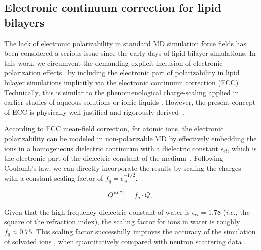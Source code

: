 \documentclass[aip,jcp,twocolumn]{revtex4}
\begin{document}
\subsection{Electronic continuum correction for lipid bilayers}\label{section:ecc}
The lack of electronic polarizability in standard MD simulation force fields has been considered a serious issue since the early days of lipid bilayer simulations. In this work, we circumvent the demanding explicit inclusion of electronic polarization effects~\cite{lucas12, chowdhary13} by including the electronic part of polarizability in lipid bilayer simulations implicitly via the electronic continuum correction (ECC)~\cite{leontyev11}. Technically, this is similar to the phenomenological charge-scaling applied in earlier studies of aqueous solutions or ionic liquids \cite{jonsson86, egberts94, beichel14}. However, the present concept of ECC is physically well justified and rigorously derived~\cite{leontyev09, leontyev10, leontyev11, leontyev14}.

According to ECC mean-field correction, for atomic ions, the electronic polarizability can be modeled in non-polarizable MD by effectively embedding the ions in a homogeneous dielectric continuum with a dielectric constant $\epsilon_{el}$, which is the electronic part of the dielectric constant of the medium~\cite{leontyev11}. Following Coulomb's law,  we can directly incorporate the results by scaling the charges with a constant scaling factor of $f_q = \epsilon _{el} ^{-1/2}$.

\begin{equation}
Q^{ECC} = f_q \cdot Q ,
\end{equation}

Given that the  high frequency dielectric constant of water is $\epsilon _{el} = 1.78$ (\textit{i.e.,} the square of the refraction index), the scaling factor for ions in water is roughly $f_q \approx 0.75$. This scaling factor successfully improves the accuracy of the simulation of solvated ions \cite{kohagen14, kohagen16, REF}, when quantitatively compared with neutron scattering data \cite{kohagen14,kohagen16, Pluharova2014}.
\end{document}
